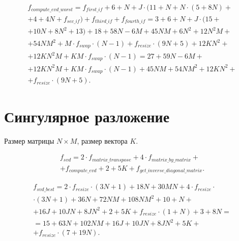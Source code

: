 \begin{equation}
	\begin{gathered}
		f_{compute\_evd\_worst} = f_{first\_if} + 6 + N + J \cdot (11 + N + N \cdot (5 + 8N) +\\+ 4 + 4N + f_{sec\_if}) + f_{third\_if} + f_{fourth\_if} = 
		3 + 6 + N + J \cdot (15 +\\+ 10N + 8N^2 + 13) + 18 + 58N - 6M + 45NM + 6N^2 + 12N^2M +\\+ 54NM^2 + M \cdot f_{swap} \cdot (N - 1) + f_{resize} \cdot (9N + 5)  + 12KN^2 +\\+ 12KN^2M + KM \cdot f_{swap} \cdot (N - 1) = 27 + 59N -6M +\\+ 12KN^2M + KM \cdot f_{swap} \cdot (N - 1) + 45NM + 54NM^2 + 12KN^2 +\\+
		f_{resize} \cdot (9N + 5).
	\end{gathered}
\end{equation}

\section{Сингулярное разложение}

Размер матрицы $N \times M$, размер вектора $K$.

\begin{equation}
	\begin{gathered}
		f_{svd} = 2 \cdot f_{matrix\_transpose} + 4 \cdot f_{matrix\_by\_matrix} +\\+ 
		f_{compute\_evd} + 2 + 5K + f_{get\_inverse\_diagonal\_matrix}.
	\end{gathered}
\end{equation}

\begin{equation}
	\begin{gathered}
		f_{svd\_best} = 2 \cdot f_{resize} \cdot (3N + 1) + 18N + 30MN + 4 \cdot  f_{resize} \cdot\\\cdot (3N + 1) + 36N + 72NM + 108NM^2 + 
		10 + N +\\+ 16J + 10JN + 8JN^2 + 2 + 5K + f_{resize} \cdot (1 + N) + 3 + 8N =\\=
		15 + 63N + 102NM + 16J + 10JN + 8JN^2 + 5K +\\+ f_{resize} \cdot (7 + 19N).
	\end{gathered}
\end{equation}

